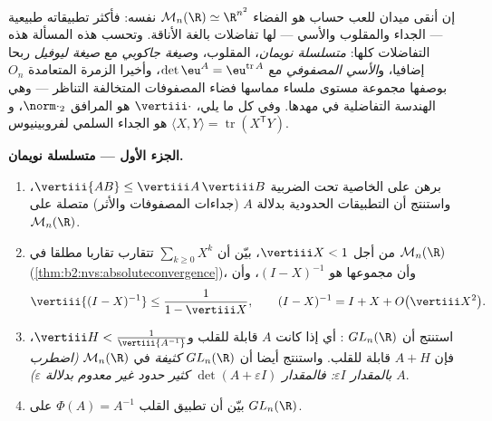 \begin{problem}\label{pb:b2:diffcalc:1}
إن أنقى ميدان للعب حساب  هو الفضاء $\mathcal M_n(\R) \simeq \R^{n^2}$ نفسه: فأكثر
تطبيقاته طبيعية --- الجداء والمقلوب  والأسي --- لها تفاضلات
بالغة الأناقة. وتحسب هذه المسألة هذه التفاضلات كلها: \emph{متسلسلة
نويمان}،  المقلوب، و\emph{صيغة جاكوبي}
 مع \emph{صيغة ليوفيل} ربحا إضافيا، و\emph{الأسي
المصفوفي} مع
$\det\eu^A = \eu^{\operatorname{tr}A}$، وأخيرا الزمرة المتعامدة $O_n$ بوصفها مجموعة مستوى ملساء
مماسها فضاء المصفوفات المتخالفة التناظر --- وهي الهندسة التفاضلية
في مهدها. وفي كل ما يلي، $\vertiii\cdot$ هو  المرافق 
$\norm\cdot_2$، و$\langle X, Y\rangle =
\operatorname{tr}(X^{\mathsf T}Y)$ هو الجداء السلمي لفروبينيوس.

\medskip
\noindent\textbf{الجزء الأول --- متسلسلة نويمان.}
\begin{enumerate}
  \item برهن على الخاصية تحت الضربية $\vertiii{AB} \leq
        \vertiii A\,\vertiii B$، واستنتج أن التطبيقات
        الحدودية بدلالة $A$ (جداءات المصفوفات  والأثر)
        متصلة على $\mathcal M_n(\R)$.
  \item من أجل $\vertiii X < 1$، بيّن أن $\sum_{k\geq0}X^k$ تتقارب تقاربا مطلقا في $\mathcal M_n(\R)$
        (\cref{thm:b2:nvs:absoluteconvergence})، وأن مجموعها هو $(I - X)^{-1}$، وأن
        \[
        \vertiii{(I - X)^{-1}} \leq \frac{1}{1 - \vertiii X},
        \qquad
        (I - X)^{-1} = I + X + O\bigl(\vertiii X^2\bigr) .
        \]
  \item استنتج أن $GL_n(\R)$ \emph{}: أي إذا كانت $A$ قابلة
        للقلب و$\vertiii H <
        \frac{1}{\vertiii{A^{-1}}}$، فإن $A + H$ قابلة للقلب. واستنتج أيضا أن $GL_n(\R)$
        \emph{كثيفة} في $\mathcal M_n(\R)$ \emph{(اضطرب $A$ بالمقدار $\varepsilon I$:
        فالمقدار $\det(A + \varepsilon I)$ كثير حدود غير معدوم بدلالة $\varepsilon$)}.
  \item بيّن أن تطبيق القلب $\Phi(A) = A^{-1}$  على $GL_n(\R)$.
\end{enumerate}


\end{problem}
